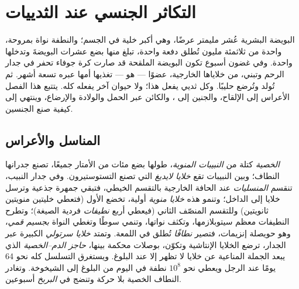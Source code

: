 \chapter{التكاثر الجنسي عند الثدييات}\label{ch:b2:mammal-reproduction}

البويضة البشرية عُشر مليمتر عرضًا، وهي أكبر خلية في الجسم؛ والنطفة
نواة بمروحة، واحدة من ثلاثمئة مليون تُطلق دفعة واحدة، تبلغ منها بضع
عشرات البويضةَ وتدخلها واحدة. وفي غضون أسبوع تكون البويضة الملقحة قد
صارت كرة جوفاء تحفر في جدار الرحم وتبني، من خلاياها الخارجية،
عضوًا --- هو  --- تغذيها أمها عبره تسعة أشهر. ثم تُولد وتُرضع
حليبًا. وكل ثديي يفعل هذا؛ ولا حيوان آخر يفعله كله. يتتبع هذا الفصل
الأعراس إلى الإلقاح، والجنين إلى ، والكائن عبر الحمل
والولادة والإرضاع، وينتهي إلى كيفية صنع الجنسين.

\section{المناسل والأعراس}

\begin{definition}\label{def:b2:mammal-reproduction:testis}
\emph{الخصية} كتلة من \emph{النبيبات المنوية}، طولها بضع
مئات من الأمتار جميعًا، تصنع جدرانها النطاف؛ وبين النبيبات
تقع \emph{خلايا لايديغ} التي تصنع التستوستيرون. وفي جدار النبيب،
تنقسم \emph{المنسليات} عند الحافة الخارجية بالتقسم الخيطي، فتبقي
جمهرة جذعية وترسل خلايا إلى الداخل؛ وتنمو هذه \emph{خلايا منوية}
أولية، تخضع  الأول (فتعطي خليتين منويتين ثانويتين)
وللتقسم المنصّف الثاني (فيعطي أربع \emph{نطيفات} فردية الصيغة)؛
وتطرح النطيفات معظم سيتوبلازمها، وتكثف نواتها،
وتنمي سوطًا وتغطي النواة \emph{بجسيم قمي}، وهو
حويصلة إنزيمات، فتصير \emph{نطافًا} تُطلق
في اللمعة. وتمتد \emph{خلايا سرتولي} الكبيرة عبر الجدار، ترضع
الخلايا الإنتاشية وتكوّن، بوصلات محكمة بينها،
\emph{حاجز الدم--الخصية} الذي يبعد الجملة المناعية عن
خلايا لا تظهر إلا عند البلوغ. ويستغرق التسلسل كله نحو
\num{64} يومًا عند الرجل ويعطي نحو $10^{8}$ نطفة في اليوم من
البلوغ إلى الشيخوخة. وتغادر النطاف الخصية بلا حركة وتنضج في
\emph{البربخ} أسبوعين.
\end{definition}

